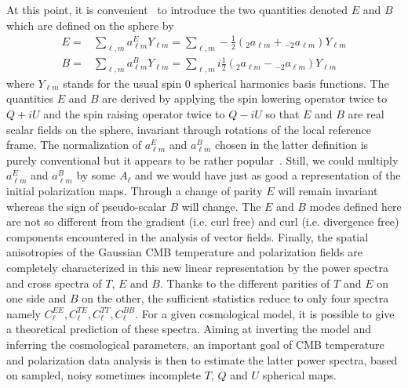 At this point, it is convenient~\citep{zalda} to introduce the two quantities denoted $E$ and $B$ which are defined on the sphere by 
\begin{eqnarray}
\label{EB}
E = &  \sum_{\ell, m}   a_{\ell m} ^E Y_{\ell m} =  \sum_{\ell, m}  - \frac{ 1}{2}   ({_{ 2}a_{\ell m}}  +  {_{- 2}a_{\ell m}} )    Y_{\ell m} \\ \nonumber
B = & \sum_{\ell, m}   a_{\ell m} ^B Y_{\ell m} =  \sum_{\ell, m}  i \frac{ 1}{2}    ({_{ 2}a_{\ell m}}  -  {_{- 2}a_{\ell m}} )   Y_{\ell m} 
\end{eqnarray} 
where $Y_{\ell m}$ stands for the usual spin 0 spherical harmonics basis functions. The quantities $E$ and $B$ are derived by applying 
the spin lowering operator twice to $Q + i U$  and the spin raising operator twice to $Q - i U$ so that $E$ and $B$ are real scalar 
fields on the sphere, invariant through rotations of the local reference frame. The normalization of $a_{\ell m} ^E$ and $a_{\ell m} ^B$ 
chosen in the latter definition is purely conventional but it appears to be rather popular~\citep{1997PhRvD..55.1830Z,2003PhRvD..67b3501B}. 
Still, we could multiply $a_{\ell m} ^E$ and $a_{\ell m} ^B$ by some $A_{\ell}$ and we would have just as good a representation of the initial 
polarization maps. Through a change of parity $E$ will remain invariant whereas the sign of pseudo-scalar $B$ will change. The $E$ and $B$ 
modes defined here are not so different from the gradient (i.e. curl free) and curl (i.e. divergence free) components 
encountered in the analysis of vector fields. Finally, the spatial anisotropies of the Gaussian CMB temperature and polarization fields are 
completely characterized in this new linear representation by the power spectra and cross spectra of $T$, $E$ and $B$. Thanks to the different 
parities of $T$ and $E$ on one side and $B$ on the other, the sufficient statistics reduce to only four spectra namely $C_\ell^{EE}, C_\ell^{TE}, 
C_\ell^{TT}, C_\ell^{BB}$. For a given cosmological model, it is possible to give a theoretical prediction of these spectra. Aiming at inverting 
the model and inferring the cosmological parameters, an important goal of CMB temperature and polarization data analysis is then to estimate the 
latter power spectra, based on sampled, noisy sometimes incomplete $T$, $Q$ and $U$ spherical maps.  

